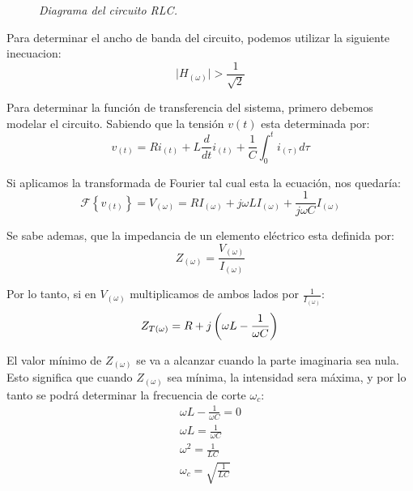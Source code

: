 \documentclass[a4paper,12pt]{report}
\begin{document}
\begin{enumerate}[label=\alph*), left=0pt]
\begin{figure}[h]
                    \textit{Diagrama del circuito RLC.}
                \end{figure}

                Para determinar el ancho de banda del circuito, podemos utilizar la siguiente inecuacion:
                \begin{equation}
                    \label{ancho.de.banda}
                    \lvert H_{(\omega)} \rvert > \frac{1}{\sqrt{2}}
                \end{equation}

                Para determinar la función de transferencia del sistema, primero debemos modelar el circuito. Sabiendo
                que la tensión $v(t)$ esta determinada por:
                \begin{equation*}
                    v_{(t)} = Ri_{(t)} + L \frac{d}{dt} i_{(t)} + \frac{1}{C} \int_{0}^{t} i_{(\tau)} d\tau
                \end{equation*}

                Si aplicamos la transformada de Fourier tal cual esta la ecuación, nos quedaría:
                \begin{equation*}
                    \mathcal{F} \left\{ v_{(t)} \right\} = V_{(\omega)} = R I_{(\omega)} + j \omega L I_{(\omega)} +
                        \frac{1}{j \omega C} I_{(\omega)}
                \end{equation*}

                Se sabe ademas, que la impedancia de un elemento eléctrico esta definida por:
                \begin{equation}
                    \label{impedancia}
                    Z_{(\omega)} = \frac{V_{(\omega)}}{I_{(\omega)}}
                \end{equation}

                Por lo tanto, si en $V_{(\omega)}$ multiplicamos de ambos lados por $\frac{1}{I_{(\omega)}}$:
                \begin{equation*}
                    Z_{T(\omega)} = R + j \left(\omega L - \frac{1}{\omega C}\right)\\
                \end{equation*}

                El valor mínimo de $Z_{(\omega)}$ se va a alcanzar cuando la parte imaginaria sea nula. Esto significa
                que cuando $Z_{(\omega)}$ sea mínima, la intensidad sera máxima, y por lo tanto se podrá determinar la
                frecuencia de corte $\omega_c$:
                \begin{gather*}
                    \omega L - \frac{1}{\omega C} = 0\\
                    \omega L = \frac{1}{\omega C}\\
                    \omega^2 = \frac{1}{LC}\\
                    \omega_c = \sqrt{\frac{1}{LC}}
                \end{gather*}


\end{enumerate}
\end{document}
